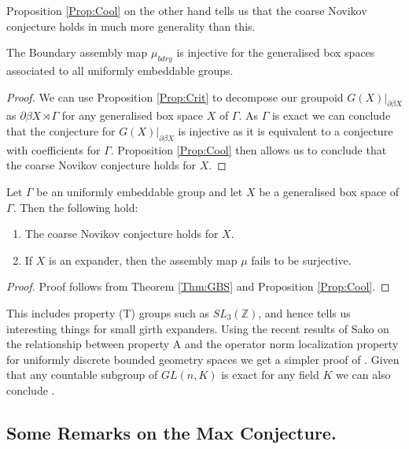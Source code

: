 Proposition \ref{Prop:Cool} on the other hand tells us that the coarse Novikov conjecture holds in much more generality than this. 

\begin{theorem}\label{Thm:GBS}
The Boundary assembly map $\mu_{bdry}$ is injective for the generalised box spaces associated to all uniformly embeddable groups.
\end{theorem}
\begin{proof}
We can use Proposition \ref{Prop:Crit} to decompose our groupoid $G(X)|_{\partial \beta X}$ as $\partial\beta X \rtimes \Gamma$ for any generalised box space $X$ of $\Gamma$. As $\Gamma$ is exact we can conclude that the conjecture for $G(X)|_{\partial \beta X}$ is injective as it is equivalent to a conjecture with coefficients for $\Gamma$. Proposition \ref{Prop:Cool} then allows us to conclude that the coarse Novikov conjecture holds for $X$.
\end{proof}

\begin{corollary}
Let $\Gamma$ be an uniformly embeddable group and let $X$ be a generalised box space of $\Gamma$. Then the following hold:
\begin{enumerate}
\item The coarse Novikov conjecture holds for $X$.
\item If $X$ is an expander, then the assembly map $\mu$ fails to be surjective.
\end{enumerate}
\end{corollary}
\begin{proof}
Proof follows from Theorem \ref{Thm:GBS} and Proposition \ref{Prop:Cool}.
\end{proof}
This includes property (T) groups such as $SL_{3}(\mathbb{Z})$, and hence tells us interesting things for small girth expanders. Using the recent results of Sako on the relationship between property A and the operator norm localization property for uniformly discrete bounded geometry spaces \cite{AONL-2012} we get a simpler proof of \cite[Theorem 7.1]{MR2419930}. Given that any countable subgroup of $GL(n,K)$ is exact for any field $K$ \cite{MR2217050} we can also conclude \cite[Theorem 5.3]{MR2764895}.

\subsection{Some Remarks on the Max Conjecture.}

